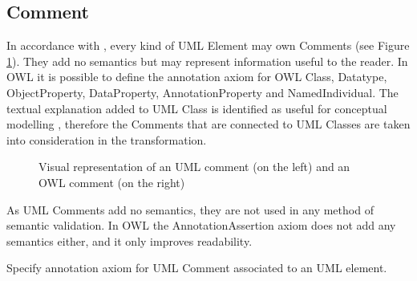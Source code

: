 \subsection{Comment}

In accordance with \citep{uml2.5}, every kind of UML Element may own Comments (see Figure \ref{fig:comment-visual}). They add no semantics but may represent information useful to the reader. In OWL it is possible to define the annotation axiom for OWL Class, Datatype, ObjectProperty, DataProperty, AnnotationProperty and NamedIndividual. The textual explanation added to UML Class is identified as useful for conceptual modelling \cite{uml-userguide}, therefore the Comments that are connected to UML Classes are taken into consideration in the transformation.

\begin{figure}[!h]
	\centering
	\begin{subfigure}{.4\textwidth}
		\centering
	\end{subfigure}%
	\begin{subfigure}{.6\textwidth}
		\centering
	\end{subfigure}
	\caption{Visual representation of an UML comment (on the left) and an OWL comment (on the right)}
	\label{fig:comment-visual}
\end{figure}

As UML Comments add no semantics, they are not used in any method of
semantic validation. In OWL the AnnotationAssertion \citep{owl2} axiom does
not add any semantics either, and it only improves readability.

\begin{trule}[Comment]
	\label{rule:elemen-external-comment}	
	Specify annotation axiom for UML Comment associated to an UML element. 
\end{trule}

